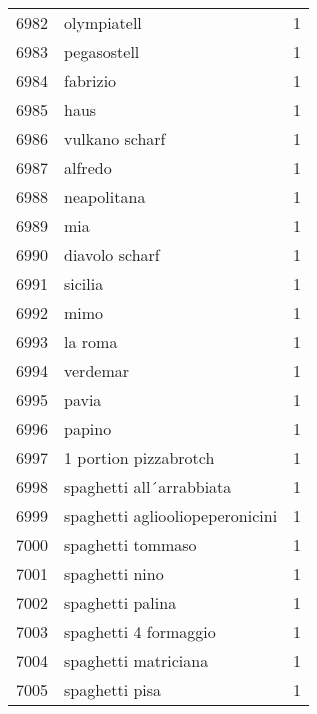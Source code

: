\begin{tabular}{llr}
6982 &                                        olympiatell &      1 \\
6983 &                                        pegasostell &      1 \\
6984 &                                           fabrizio &      1 \\
6985 &                                               haus &      1 \\
6986 &                                     vulkano scharf &      1 \\
6987 &                                            alfredo &      1 \\
6988 &                                        neapolitana &      1 \\
6989 &                                                mia &      1 \\
6990 &                                     diavolo scharf &      1 \\
6991 &                                            sicilia &      1 \\
6992 &                                               mimo &      1 \\
6993 &                                            la roma &      1 \\
6994 &                                           verdemar &      1 \\
6995 &                                              pavia &      1 \\
6996 &                                             papino &      1 \\
6997 &                              1 portion pizzabrotch &      1 \\
6998 &                           spaghetti all´arrabbiata &      1 \\
6999 &                    spaghetti agliooliopeperonicini &      1 \\
7000 &                                  spaghetti tommaso &      1 \\
7001 &                                     spaghetti nino &      1 \\
7002 &                                   spaghetti palina &      1 \\
7003 &                              spaghetti 4 formaggio &      1 \\
7004 &                               spaghetti matriciana &      1 \\
7005 &                                     spaghetti pisa &      1 \\

\end{tabular}
